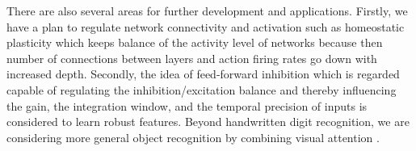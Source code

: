\documentclass[preprint,12pt]{elsarticle}
\begin{document}
There are also several areas for further development and applications.
Firstly, we have a plan to regulate network connectivity and activation  such as homeostatic plasticity \cite{Tien2018} which keeps balance of the activity level of networks because then number of connections between layers and action firing rates go down with increased depth. 
Secondly, the idea of feed-forward inhibition which is regarded capable of regulating the inhibition/excitation balance and thereby influencing the gain, the integration window, and the temporal precision of inputs \cite{DSouza2016} is considered to learn robust features.
Beyond handwritten digit recognition, we are considering more general object recognition by combining visual attention \cite{Rea2013}.

%
%




 
% 







\end{document}

